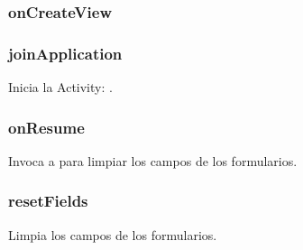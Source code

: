 \documentclass[letterpaper,10pt,english]{sphinxmanual}
\begin{document}
\subsubsection{onCreateView}
\label{Fragments/LogInFragment:oncreateview}

\subsubsection{joinApplication}
\label{Fragments/LogInFragment:joinapplication}

\begin{fulllineitems}
\label{Fragments/LogInFragment:com.fiuba.tallerii.jobify.LogInFragment.joinApplication()}
Inicia la Activity: .

\end{fulllineitems}



\subsubsection{onResume}
\label{Fragments/LogInFragment:onresume}

\begin{fulllineitems}
\label{Fragments/LogInFragment:com.fiuba.tallerii.jobify.LogInFragment.onResume()}
Invoca a  para limpiar los campos de los formularios.

\end{fulllineitems}



\subsubsection{resetFields}
\label{Fragments/LogInFragment:resetfields}

\begin{fulllineitems}
\label{Fragments/LogInFragment:com.fiuba.tallerii.jobify.LogInFragment.resetFields()}
Limpia los campos de los formularios.

\end{fulllineitems}
\end{document}
